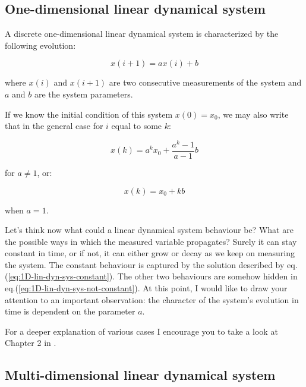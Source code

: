 \documentclass[10pt,twocolumn]{article}
\begin{document}

\subsection{One-dimensional linear dynamical system}

A discrete one-dimensional linear dynamical system is characterized by the following evolution:

\begin{equation}
x(i+1) = a x(i) + b
\end{equation}

where $x(i)$ and $x(i+1)$ are two consecutive measurements of the system and $a$ and $b$ are the system parameters.

If we know the initial condition of this system $x(0) = x_0$, we may also write that in the general case for $i$ equal to some $k$:

\begin{equation} \label{eq:1D-lin-dyn-sys-not-constant}
x(k) = a^k x_0 + \frac{a^k - 1}{a - 1} b
\end{equation}

for $a \neq 1$, or:

\begin{equation} \label{eq:1D-lin-dyn-sys-constant}
x(k) = x_0 + k b
\end{equation}

when $a = 1$.

Let's think now what could a linear dynamical system behaviour be? What are the possible ways in which the measured variable propagates? Surely it can stay constant in time, or if not, it can either grow or decay as we keep on measuring the system. The constant behaviour is captured by the solution described by eq.(\ref{eq:1D-lin-dyn-sys-constant}). The other two behaviours are somehow hidden in eq.(\ref{eq:1D-lin-dyn-sys-not-constant}). At this point, I would like to draw your attention to an important observation: the character of the system's evolution in time is dependent on the parameter $a$.

For a deeper explanation of various cases I encourage you to take a look at Chapter 2 in \cite{Prof_Edward_Scheinerman}.

\subsection{Multi-dimensional linear dynamical system}
\end{document}
